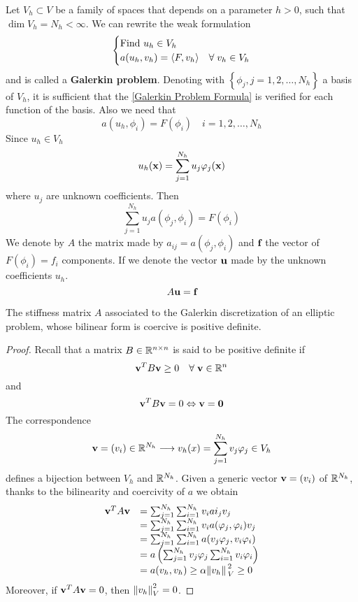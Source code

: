 Let \(V_h \subset V\) be a family of spaces that depends on a parameter \(h > 0\), such that \(\dim V_h = N_h < \infty\).
We can rewrite the weak formulation 
\begin{equation}
    \begin{cases}
        \text{Find } u_h \in V_h\\
        a(u_h,v_h) = \langle F,v_h \rangle & \forall \; v_h \in V_h \label{Galerkin Problem Formula}
    \end{cases}
\end{equation}
and is called a \textbf{Galerkin problem}. Denoting with \(\left\{\phi_j, j = 1,2,\ldots,N_h\right\}\) a basis of \(V_h\), it is sufficient that the \eqref{Galerkin Problem Formula} is verified for each function of the basis. 
Also we need that 
\[
    a(u_h, \phi_i) = F(\phi_i) \quad i = 1, 2, \ldots , N_h
\]
Since \(u_h \in V_h\)
\[
    u_h(\textbf{x})=\sum_{j=1}^{N_h} u_j \varphi_j(\textbf{x})
\]
where \(u_j\) are unknown coefficients. Then
\[
    \sum_{j=1}^{N_h}u_j a(\phi_j, \phi_i) = F(\phi_i)
\]
We denote by \(A\) the matrix made by \(a_{ij} = a(\phi_j, \phi_i)\) and \(\textbf{f}\) the vector of \(F(\phi_i) = f_i\) components. If we denote the vector \(\textbf{u}\) made by the unknown coefficients \(u_h\).
\begin{equation}
    A\textbf{u} = \textbf{f}
    \label{Linear system Galerkin}
\end{equation}
\begin{theorem}
    The stiffness matrix \(A\) associated to the Galerkin discretization of an elliptic problem, whose bilinear form is coercive is positive definite.
\end{theorem}
\begin{proof}
    Recall that a matrix \(B \in \mathbb{R}^{n\times n}\) is said to be positive definite if 
    \[
        \textbf{v}^TB\textbf{v} \geq 0 \quad \forall \; \textbf{v} \in \mathbb{R}^n
    \]
    and
    \[
        \textbf{v}^T B \textbf{v} = 0 \Leftrightarrow \textbf{v} = \textbf{0}
    \]
    The correspondence 
    \[
        \textbf{v} = (v_i) \in \mathbb{R}^{N_h} \longrightarrow v_h(x) = \sum_{j=1}^{N_h} v_j\varphi_j \in V_h
    \]
    defines a bijection between \(V_h\) and \(\mathbb{R}^{N_h}\). Given a generic vector \(\textbf{v} = (v_i)\) of \(\mathbb{R}^{N_h}\), thanks to the bilinearity and coercivity of \(a\) we obtain 
    \[
        \begin{array}{rl}
        \textbf{v}^T A \textbf{v} & = \sum_{j=1}^{N_h}\sum_{i=1}^{N_h} v_i ai_j v_j \\
        & = \sum_{j=1}^{N_h}\sum_{i=1}^{N_h} v_ia(\varphi_j, \varphi_i)v_j\\
        & = \sum_{j=1}^{N_h}\sum_{i=1}^{N_h} a(v_j\varphi_j, v_i \varphi_i)\\
        & = a\left(\sum_{j=1}^{N_h}v_j\varphi_j\sum_{i=1}^{N_h}v_i\varphi_i\right)\\
        & = a(v_h,v_h) \geq \alpha \norm*{v_h}_V^2 \geq 0
        \end{array}
    \]
    Moreover, if \(\textbf{v}^T A \textbf{v} = 0\), then \(\norm{v_h}_V^2 = 0\).
\end{proof}
